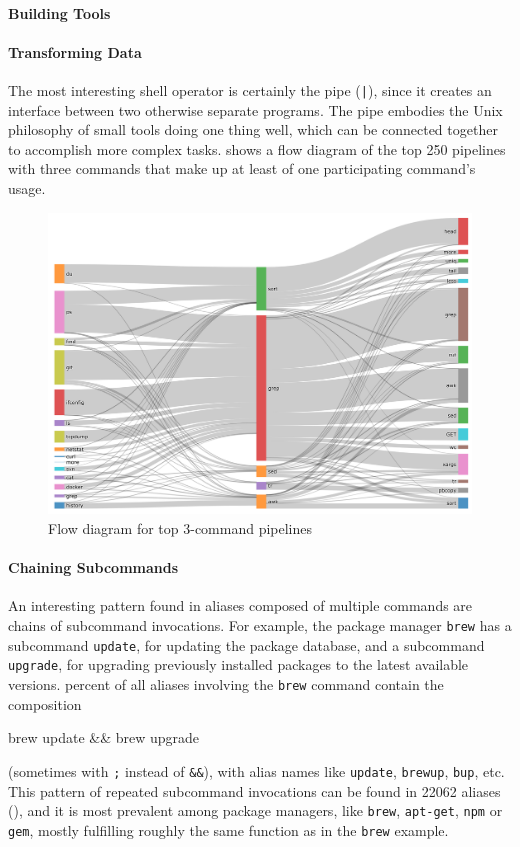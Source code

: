 \paragraph{\bf Building Tools}

\TODO

\paragraph{\bf Transforming Data}

The most interesting shell operator is certainly the pipe (\verb`|`), since it creates an interface between two otherwise separate programs.
The pipe embodies the Unix philosophy of small tools doing one thing well, which can be connected together to accomplish more complex tasks.
 shows a flow diagram of the top 250 pipelines with three commands that make up at least  of one participating command's usage.
\TODO

\begin{figure}[h]
	\centering    
	\includegraphics[width=0.9\linewidth]{figures/flow_250.png}
	\caption{Flow diagram for top 3-command pipelines}
	\label{fig:flow}
\end{figure}

\paragraph{\bf Chaining Subcommands}

An interesting pattern found in aliases composed of multiple commands are chains of subcommand invocations.
For example, the package manager \verb|brew| has a subcommand \verb|update|, for updating the package database, and a subcommand \verb|upgrade|, for upgrading previously installed packages to the latest available versions.
 percent of all aliases involving the \verb|brew| command contain the composition
\begin{CVerbatim}
brew update && brew upgrade
\end{CVerbatim}
(sometimes with \verb|;| instead of \verb|&&|), with alias names like \verb|update|, \verb|brewup|, \verb|bup|, etc.
This pattern of repeated subcommand invocations can be found in \num{22062} aliases (), and it is most prevalent among package managers, like \verb|brew|, \verb|apt-get|, \verb|npm| or \verb|gem|, mostly fulfilling roughly the same function as in the \verb|brew| example.

